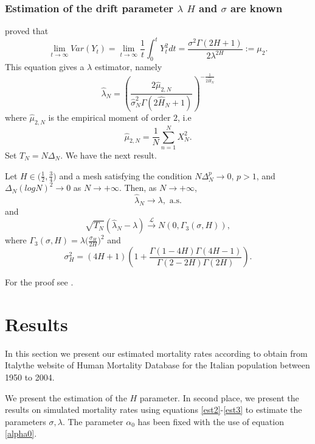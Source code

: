 \documentclass[smallextended]{svjour3}
\begin{document}
    \subsubsection{Estimation of the drift parameter $\lambda$  $H$ and
                $\sigma$ are known}
    \citet{hu-nu} proved that
    \[
        \lim_{t\rightarrow \infty} Var (Y_t)= \lim_{t\rightarrow \infty}
        \frac{1}{t}\int_0^t Y_t^2 dt = \frac{\sigma^2 \Gamma(2H+1) }
        {2\lambda^{2H}}:=\mu_2.
    \]
    This equation gives a $\lambda$ estimator, namely
    \begin{equation} \label{est3}
        \hat{\lambda}_N = 
            \left(
                \dfrac{ 2\hat{\mu}_{2,N} }{ 
                    \hat{\sigma}_N^2 
                    \Gamma(2\hat{H}_N+1)
                }
            \right) ^ {-\tfrac{1}{2\hat{H}_N}}
    \end{equation}
    where $\hat{\mu}_{2,N}$ is the empirical moment of order $2$, i.e
    \[
        \hat{\mu}_{2,N} =
            \dfrac{1}{N}
            \sum_{n=1}^N X_N^2.
    \]
    Set $T_N=N\Delta_N$. We have the next result.
    \begin{theorem}
        Let $H \in \big(\tfrac{1}{2} , \tfrac{3}{4}\big)$ and a mesh satisfying 
        the condition $N \Delta_N^p\rightarrow 0$, $p>1$,
        and $ \Delta_N (log N )^2 \rightarrow 0$ as $N \rightarrow +\infty$. 
        Then,
        as $N \rightarrow +\infty$,
        \[
            \hat{\lambda}_N {\to}  \lambda, \text{ a.s.}
        \]
        and
        \[
            \sqrt{T_N} ( \hat{\lambda}_N -\lambda)
            \stackrel{\mathcal{L}}{\longrightarrow} N (0, \Gamma_3 (\sigma,H)),
        \]
        where 
        $\Gamma_3 (\sigma,H)=\lambda \big(\tfrac{\sigma_H}{2H} \big)^2$ and
        \[
            \sigma_H^2= (4H+1)
            \left(
                1+
                \frac{\Gamma(1-4H)\Gamma(4H-1)}{\Gamma(2-2H)\Gamma(2H)} 
            \right).
        \]
    \end{theorem}
    For the proof see \citep[][Thm. 2]{br-ia}.

\section{Results} \label{re-fou}
        In this section we present our estimated mortality rates according to  
    obtain from Italy\textemdash the website of Human Mortality Database for 
    the Italian population between \num{1950} to \num{2004}.

        We present the estimation of the $H$ parameter. 
    In second place, we present the results on simulated mortality rates using  
    equations \eqref{est2}-\eqref{est3} to estimate the parameters 
    $\sigma,\lambda$. The parameter $\alpha_0$ has been fixed with the use of 
    equation \eqref{alpha0}.
\end{document}
